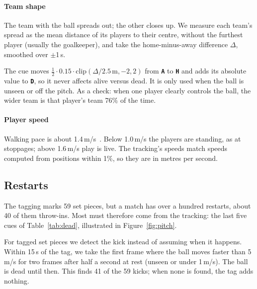 \documentclass[11pt,a4paper]{article}
\newcommand{\lH}{\textcolor{colH}{\textbf{\texttt{H}}}}
\newcommand{\lA}{\textcolor{colA}{\textbf{\texttt{A}}}}
\newcommand{\lD}{\textcolor{colDtext}{\textbf{\texttt{D}}}}
\begin{document}
\paragraph{Team shape} The team with the ball spreads out; the other closes up. We measure each
team's spread as the mean distance of its players to their centre, without the furthest player
(usually the goalkeeper), and take the home-minus-away difference $\Delta$, smoothed over $\pm$1\,s.

The cue moves $\tfrac12\cdot 0.15\cdot\mathrm{clip}(\Delta/2.5\,\mathrm{m},-2,2)$ from \lA{} to
\lH{} and adds its absolute value to \lD, so it never affects alive versus dead. It is only used
when the ball is unseen or off the pitch. As a check: when one player clearly controls the ball,
the wider team is that player's team 76\% of the time.

\paragraph{Player speed} Walking pace is about 1.4\,m/s~\cite{bohannon}. Below 1.0\,m/s the
players are standing, as at stoppages; above 1.6\,m/s play is live. The tracking's speeds match
speeds computed from positions within 1\%, so they are in metres per second.

\subsection{Restarts}\label{sec:restarts}

The tagging marks 59 set pieces, but a match has over a hundred restarts, about 40 of them
throw-ins. Most must therefore come from the tracking: the last five cues of
Table~\ref{tab:dead}, illustrated in Figure~\ref{fig:pitch}.

For tagged set pieces we detect the kick instead of assuming when it happens. Within 15\,s of the
tag, we take the first frame where the ball moves faster than 5\,m/s for two frames after half a
second at rest (unseen or under 1\,m/s). The ball is dead until then. This finds 41 of the 59
kicks; when none is found, the tag adds nothing.
\end{document}
